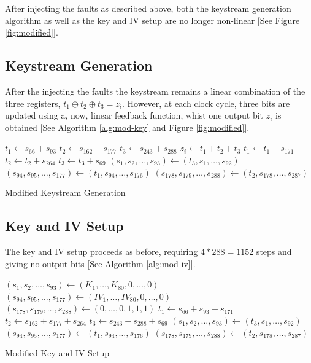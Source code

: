\documentclass[conference]{IEEEtran}
\begin{document}
After injecting the faults as described above, both the keystream generation algorithm as well as the key and IV setup are no longer non-linear [See Figure \ref{fig:modified}]. 

\subsection{Keystream Generation}

After the injecting the faults the keystream remains a linear combination of the three registers, $t_1 \oplus t_2 \oplus t_3 = z_i$. However, at each clock cycle, three bits are updated using a, now, linear feedback function, whist one output bit $z_i$ is obtained [See Algorithm \ref{alg:mod-key} and Figure \ref{fig:modified}].

\begin{algorithm}[H]
\begin{algorithmic}[1]
 
\State $t_1 \gets s_{66} + s_{93}$
\State $t_2 \gets s_{162} + s_{177}$
\State $t_3 \gets s_{243} + s_{288}$
\State
\State $z_i \gets t_1 + t_2 + t_3$
\State
\State $t_1 \gets t_1 + s_{171}$
\State $t_2 \gets t_2 + s_{264}$
\State $t_3 \gets t_3 + s_{69}$
\State
\State $(s_1,s_2,\dots,s_{93}) \gets (t_3,s_1,\dots,s_{92})$
\State $(s_{94},s_{95},\dots,s_{177}) \gets (t_1,s_{94},\dots,s_{176})$
\State $(s_{178},s_{179},\dots,s_{288}) \gets (t_2,s_{178},\dots,s_{287})$
\EndFor
\end{algorithmic}
\caption{Modified Keystream Generation} \label{alg:mod-key}
\end{algorithm}

\subsection{Key and IV Setup}

The key and IV setup proceeds as before, requiring $4*288=1152$ steps and giving no output bits [See Algorithm \ref{alg:mod-iv}].

\begin{algorithm}[H]
\begin{algorithmic}[1]
\State $(s_1,s_2,\dots,s_{93}) \gets (K_1,\dots,K_{80},0,\dots,0)$
\State $(s_{94},s_{95},\dots,s_{177}) \gets (IV_1,\dots,IV_{80},0,\dots,0)$
\State $(s_{178},s_{179},\dots,s_{288}) \gets (0,\dots,0,1,1,1)$
\State
{}
\State $t_1 \gets s_{66} + s_{93} + s_{171}$
\State $t_2 \gets s_{162} + s_{177} + s_{264}$
\State $t_3 \gets s_{243} + s_{288}+ s_{69}$
\State
\State $(s_1,s_2,\dots,s_{93}) \gets (t_3,s_1,\dots,s_{92})$
\State $(s_{94},s_{95},\dots,s_{177}) \gets (t_1,s_{94},\dots,s_{176})$
\State $(s_{178},s_{179},\dots,s_{288}) \gets (t_2,s_{178},\dots,s_{287})$
\EndFor
\end{algorithmic}
\caption{Modified Key and IV Setup} \label{alg:mod-iv}
\end{algorithm}
\end{document}
